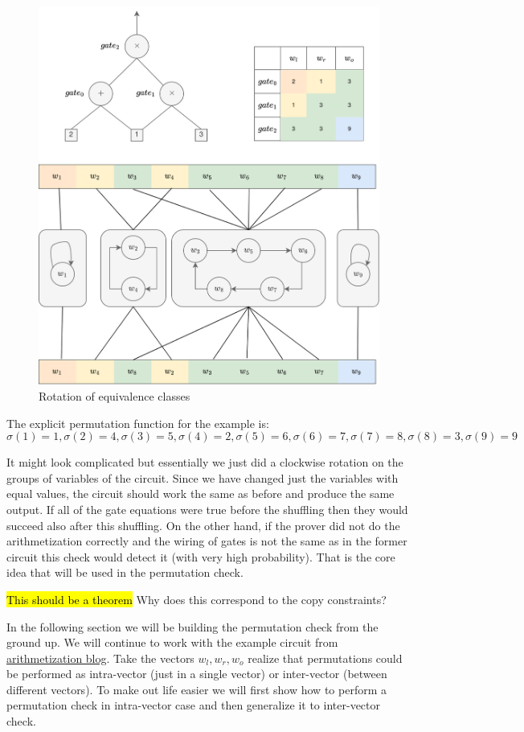 \begin{figure}[H]
    \centering
    \includegraphics[width=0.75\linewidth]{round-figures/round2/permutation_function.drawio.png}
    \caption{Rotation of equivalence classes}
\end{figure}

The explicit permutation function for the example is:
$$\sigma(1) = 1, \sigma(2) = 4, \sigma(3) = 5, \sigma(4) = 2, \sigma(5) = 6, \sigma(6) = 7, \sigma(7) = 8, \sigma(8) = 3, \sigma(9) = 9$$

It might look complicated but essentially we just did a clockwise rotation on the groups of variables of the circuit. Since we have changed just the variables with equal values, the circuit should work the same as before and produce the same output. If all of the gate equations were true before the shuffling then they would succeed also after this shuffling. On the other hand, if the prover did not do the arithmetization correctly and the wiring of gates is not the same as in the former circuit this check would detect it (with very high probability). That is the core idea that will be used in the permutation check.

\hl{This should be a theorem}
Why does this correspond to the copy constraints?

In the following section we will be building the permutation check from the ground up. We will continue to work with the example circuit from \hyperref[chap:arithmetization]{arithmetization blog}. Take the vectors $w_l, w_r, w_o$ realize that permutations could be performed as intra-vector (just in a single vector) or inter-vector (between different vectors). To make out life easier we will first show how to perform a permutation check in intra-vector case and then generalize it to inter-vector check.

